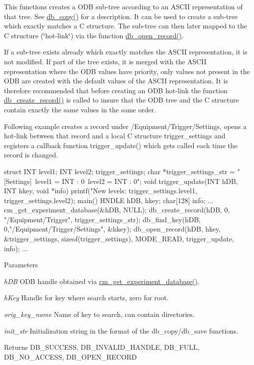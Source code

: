 This functions creates a ODB sub-\/tree according to an ASCII representation of that tree. See \hyperlink{group__odbfunctionc_ga165f2428c082852ff2ac1e8c4c78d607}{db\_\-copy()} for a description. It can be used to create a sub-\/tree which exactly matches a C structure. The sub-\/tree can then later mapped to the C structure (\char`\"{}hot-\/link\char`\"{}) via the function \hyperlink{group__odbfunctionc_ga852bc9fa8ee4d0884b328aeb0b0cfd63}{db\_\-open\_\-record()}.

If a sub-\/tree exists already which exactly matches the ASCII representation, it is not modified. If part of the tree exists, it is merged with the ASCII representation where the ODB values have priority, only values not present in the ODB are created with the default values of the ASCII representation. It is therefore recommended that before creating an ODB hot-\/link the function \hyperlink{group__odbfunctionc_ga59b971e77416b2b463e2e63f1b05342b}{db\_\-create\_\-record()} is called to insure that the ODB tree and the C structure contain exactly the same values in the same order.

Following example creates a record under /Equipment/Trigger/Settings, opens a hot-\/link between that record and a local C structure trigger\_\-settings and registers a callback function trigger\_\-update() which gets called each time the record is changed. 
\begin{DoxyCode}
struct {
  INT level1;
  INT level2;
} trigger_settings;
char *trigger_settings_str =
"[Settings]\n\
level1 = INT : 0\n\
level2 = INT : 0";
void trigger_update(INT hDB, INT hkey, void *info)
{
  printf("New levels: %
    trigger_settings.level1,
    trigger_settings.level2);
}
main()
{
  HNDLE hDB, hkey;
  char[128] info;
  ...
  cm_get_experiment_database(&hDB, NULL);
  db_create_record(hDB, 0, "/Equipment/Trigger", trigger_settings_str);
  db_find_key(hDB, 0,"/Equipment/Trigger/Settings", &hkey);
  db_open_record(hDB, hkey, &trigger_settings,
    sizeof(trigger_settings), MODE_READ, trigger_update, info);
  ...
}
\end{DoxyCode}
 
\begin{DoxyParams}{Parameters}
\item[{\em hDB}]ODB handle obtained via \hyperlink{group__cmfunctionc_ga16b33b70783a3f5ba98b4094149d12b7}{cm\_\-get\_\-experiment\_\-database()}. \item[{\em hKey}]Handle for key where search starts, zero for root. \item[{\em orig\_\-key\_\-name}]Name of key to search, can contain directories. \item[{\em init\_\-str}]Initialization string in the format of the db\_\-copy/db\_\-save functions. \end{DoxyParams}
\begin{DoxyReturn}{Returns}
DB\_\-SUCCESS, DB\_\-INVALID\_\-HANDLE, DB\_\-FULL, DB\_\-NO\_\-ACCESS, DB\_\-OPEN\_\-RECORD 
\end{DoxyReturn}


